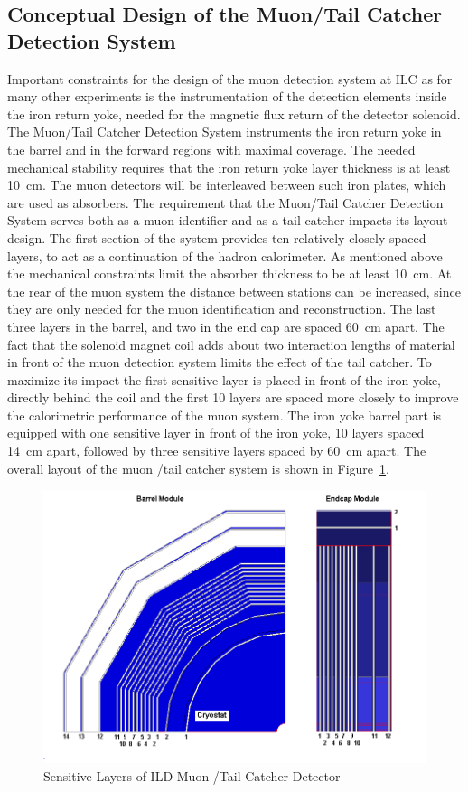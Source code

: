 \subsection{Conceptual Design of the Muon/Tail Catcher Detection System}
Important constraints for the design of the muon detection system at ILC as for many other experiments is the instrumentation of the detection elements inside the iron return yoke, needed for the magnetic flux return of the detector solenoid.
The Muon/Tail Catcher Detection System instruments the iron return yoke in the barrel and in the forward regions with maximal coverage.
The needed mechanical stability requires that the iron return yoke layer thickness is at least \SI{10}{cm}. The muon detectors will be interleaved between such iron plates, which are used as absorbers.
The requirement that the Muon/Tail Catcher Detection System serves both as a muon identifier and as a tail catcher impacts its layout design.
The first section of the system provides ten relatively closely spaced layers, to act as a continuation of the hadron calorimeter.
As mentioned above the mechanical constraints limit the absorber thickness to be at least \SI{10}{cm}.
At the rear of the muon system the distance between stations can be increased, since they are only needed for the muon identification and reconstruction.
The last three layers in the barrel, and two in the end cap are spaced \SI{60}{cm} apart.
The fact that the solenoid magnet coil adds about two interaction lengths of material in front of the muon detection system limits the effect of the tail catcher.
To maximize its impact the first sensitive layer is placed in front of the iron yoke, directly behind the coil and the first 10 layers are spaced more closely to improve the calorimetric performance of the muon system.
The iron yoke barrel part is equipped with one sensitive layer in front of the iron yoke, 10 layers spaced \SI{14}{cm} apart, followed by three sensitive layers spaced by \SI{60}{cm} apart. The overall layout of the muon /tail catcher system is shown in Figure~\ref{fig:ild:muon:tailCatcher}.
\begin{figure}
	\centering
	\includegraphics[height=8cm]{MuonDetector/MuonDetectorILD/2D_barel_endcap.png}
	\caption{Sensitive Layers of ILD Muon /Tail Catcher Detector}
	\label{fig:ild:muon:tailCatcher}
\end{figure}

